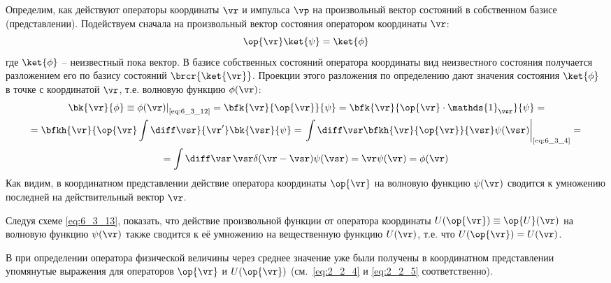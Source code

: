 Определим, как действуют операторы координаты $\vr$ и импульса $\vp$ на произвольный вектор состояний в собственном базисе (представлении). Подействуем сначала на произвольный вектор состояния оператором координаты $\vr$:%
%
\begin{equation}
\label{eq:6_3_12}
\op{\vr} \ket{\psi} = \ket{\phi}
\end{equation}%
%
где $\ket{\phi}$ -- неизвестный пока вектор. В базисе собственных состояний оператора координаты вид неизвестного состояния получается разложением его по базису состояний $\brcr{\ket{\vr}}$. Проекции этого разложения по определению дают значения состояния $\ket{\phi}$ в точке с координатой $\vr$, т.е. волновую функцию $\phi(\vr)$:%
%
\begin{equation}
\label{eq:6_3_13}
\begin{gathered}
	\left.\bk{\vr}{\phi} \equiv \phi(\vr)\right|_{\text{\eqref{eq:6_3_12}}} =
	\bfk{\vr}{\op{\vr}}{\psi} = 
	\bfk{\vr}{\op{\vr} \cdot \mathds{1}_{\vsr}}{\psi} = \\ =
	\bfkh{\vr}{\op{\vr}\int \diff\vsr}{\vr'} \bk{\vsr}{\psi} =
	\left.\int \diff\vsr \bfkh{\vr}{\op{\vr}}{\vsr} \psi(\vsr) \right|_{\text{\eqref{eq:6_3_4}}} = \\ =
 	\int \diff\vsr \, \vsr \delta(\vr - \vsr) \psi(\vsr) = \vr \psi(\vr) = \phi(\vr)
\end{gathered}
\end{equation}%
%
Как видим, в координатном представлении действие оператора координаты $\op{\vr}$ на волновую функцию $\psi(\vr)$ сводится к умножению последней на действительный вектор $\vr$.%
%
\begin{excr}
Следуя схеме \eqref{eq:6_3_13}, показать, что действие произвольной функции от оператора координаты $U(\op{\vr}) \equiv \op{U}(\vr)$ на волновую функцию $\psi(\vr)$ также сводится к её умножению на вещественную функцию $U(\vr)$, т.е. что $U(\op{\vr})=U(\vr)$.
\end{excr}%
%
В  при определении оператора физической величины через среднее значение уже были получены в координатном представлении упомянутые выражения для операторов $\op{\vr}$ и $U(\op{\vr})$ (см.~\eqref{eq:2_2_4} и \eqref{eq:2_2_5} соответственно).

